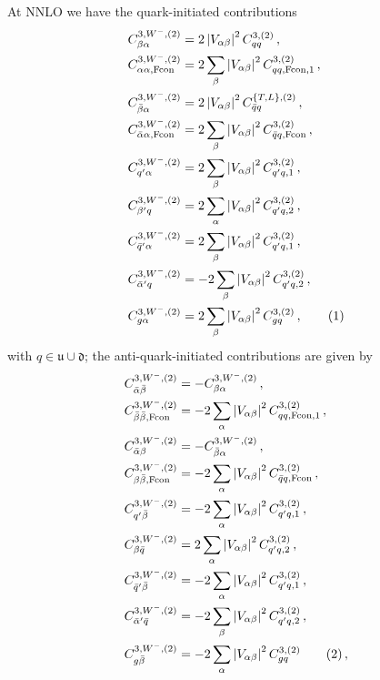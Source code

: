 \documentclass[11pt,a4paper]{article}
\newcommand{\qb}{\bar{q}}
\newcommand{\qp}{{q^\prime}}
\newcommand{\qbp}{{\bar{q}^\prime}}
\newcommand\numberthis{\addtocounter{equation}{1}\tag{\theequation}}
\newcommand{\Fcon}{\mathrm{Fcon}}
\begin{document}
At NNLO we have the quark-initiated contributions
\begin{align*}
C^{3,W^-,(2)}_{\beta\alpha} & = 2 \left|V_{\alpha\beta} \right|^2 C^{3,(2)}_{qq}  \,  , \\
C^{3,W^-,(2)}_{\alpha\alpha,\Fcon} &= 2 \sum_\beta \left|V_{\alpha\beta} \right|^2 C^{3,(2)}_{qq, \Fcon, 1}  \,  , \\
C^{3,W^-,(2)}_{\bar{\beta} \alpha} & = 2 \left|V_{\alpha\beta} \right|^2 C^{\{T,L\},(2)}_{\qb q}  \,  , \\
C^{3,W^-,(2)}_{\bar{\alpha} \alpha, \Fcon} &= 2 \sum_\beta \left|V_{\alpha\beta} \right|^2 C^{3,(2)}_{\qb q, \Fcon}  \,  , \\
C^{3,W^-,(2)}_{\qp \alpha} & = 2 \sum_\beta \left|V_{\alpha\beta}\right|^2 C^{3,(2)}_{\qp q, 1}  \,  , \\
C^{3,W^-,(2)}_{\beta' q} & = 2 \sum_\alpha \left|V_{\alpha\beta}\right|^2 C^{3,(2)}_{\qp q, 2} \,  , \\
C^{3,W^-,(2)}_{\qbp \alpha} & = 2 \sum_\beta \left|V_{\alpha\beta}\right|^2  C^{3,(2)}_{\qp q, 1}  \,  , \\
C^{3,W^-,(2)}_{\bar{\alpha}' q} & = -2 \sum_\beta \left|V_{\alpha\beta}\right|^2 C^{3,(2)}_{\qp q, 2} \,  , \\
C^{3,W^-,(2)}_{g\alpha} &= 2 \sum_\beta \left|V_{\alpha\beta}\right|^2 C^{3,(2)}_{gq} \, , \numberthis
\end{align*}
with $q\in\mathfrak{u}\cup\mathfrak{d}$; the anti-quark-initiated contributions are given by
 \begin{align*}
C^{3,W^-,(2)}_{\bar{\alpha}\bar{\beta}} & = -C^{3,W^-,(2)}_{\beta\alpha}  \,  , \\
C^{3,W^-,(2)}_{\bar{\beta}\bar{\beta},\Fcon} &= -2 \sum_\alpha \left|V_{\alpha\beta} \right|^2 C^{3,(2)}_{qq, \Fcon, 1} \,  , \\
C^{3,W^-,(2)}_{\bar{\alpha}\beta} & = -C^{3,W^-,(2)}_{\bar{\beta} \alpha} \,  , \\
C^{3,W^-,(2)}_{\beta\bar{\beta}, \Fcon} &=-2 \sum_\alpha \left|V_{\alpha\beta} \right|^2 C^{3,(2)}_{\qb q, \Fcon}  \,  , \\
C^{3,W^-,(2)}_{\qp \bar{\beta}} & = -2 \sum_\alpha \left|V_{\alpha\beta}\right|^2 C^{3,(2)}_{\qp q, 1}  \,  , \\
C^{3,W^-,(2)}_{\beta \bar{q}} & =  2 \sum_\alpha \left|V_{\alpha\beta}\right|^2 C^{3,(2)}_{\qp q, 2} \,  , \\
C^{3,W^-,(2)}_{\qbp \bar{\beta}} & = -2 \sum_\alpha \left|V_{\alpha\beta}\right|^2  C^{3,(2)}_{\qp q, 1}  \,  , \\
C^{3,W^-,(2)}_{\bar{\alpha}' \bar{q}} & = -2 \sum_\beta \left|V_{\alpha\beta}\right|^2 C^{3,(2)}_{\qp q,2} \,  , \\
C^{3,W^-,(2)}_{g\bar{\beta}} &=  -2 \sum_\alpha \left|V_{\alpha\beta}\right|^2 C^{3,(2)}_{gq}  \numberthis \, ,
\end{align*}
\end{document}
